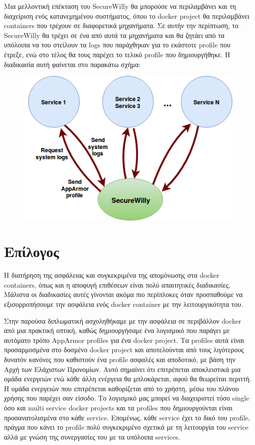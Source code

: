 Μια μελλοντική επέκταση του \en SecureWilly\gr{} θα μπορούσε να περιλαμβάνει και τη διαχείριση ενός κατανεμημένου συστήματος, όπου το \en docker project\gr{} θα περιλαμβάνει \en containers\gr{} που τρέχουν σε διαφορετικά μηχανήματα. Σε αυτήν την περίπτωση, το \en SecureWilly\gr{} θα τρέχει σε ένα από αυτά τα μηχανήματα και θα ζητάει από τα υπόλοιπα να του στείλουν τα \en logs\gr{} που παράχθηκαν για το εκάστοτε \en profile\gr{} που έτρεξε, ενώ στο τέλος θα τους παρέχει το τελικό \en profile\gr{} που δημιουργήθηκε. Η διαδικασία αυτή φαίνεται στο παρακάτω σχήμα:
\begin{figure}[H]
  \centering
   \includegraphics[width=0.6\linewidth]{figures/DistributedSystems.png}
\end{figure}

\section*{Επίλογος}

Η διατήρηση της ασφάλειας και συγκεκριμένα της απομόνωσης στα \en docker containers\gr{}, όπως και η αποφυγή επιθέσεων είναι πολύ απαιτητικές διαδικασίες. Μάλιστα οι διαδικασίες αυτές γίνονται ακόμα πιο περίπλοκες όταν προσπαθούμε να εξισορροπήσουμε την ασφάλεια ενός \en docker container\gr{} με την λειτουργικότητα του.

Στην παρούσα διπλωματική ασχοληθήκαμε με την ασφάλεια σε περιβάλλον \en docker\gr{} από μια πρακτική οπτική, καθώς δημιουργήσαμε ένα λογισμικό που παράγει με αυτόματο τρόπο \en AppArmor profiles\gr{} για ένα \en docker project\gr{}. Τα \en profiles\gr{} αυτά είναι προσαρμοσμένα στο δοσμένο \en docker project\gr{} και αποτελούνται από τους λιγότερους δυνατόν κανόνες που καθιστούν ένα \en profile\gr{} ασφαλές και αποδοτικό, με βάση την Αρχή των Ελάχιστων Προνομίων. Αυτό σημαίνει ότι επιτρέπεται αποκλειστικά μια ομάδα ενεργειών ενώ κάθε άλλη ενέργεια θα μπλοκάρεται, αφού θα θεωρείται περιττή. Η ομάδα ενεργειών που επιτρέπεται καθορίζεται από το χρήστη, μέσω του πλάνου χρήσης που παρέχει σαν είσοδο. Το λογισμικό μας μπορεί να διαχειριστεί τόσο \en single\gr{} όσο και \en multi service docker projects\gr{} και τα \en profiles\gr{} που δημιουργούνται είναι προσανατολισμένα στο κάθε \en service\gr{}. Επομένως, κάθε \en service\gr{} έχει το δικό του \en profile\gr{}, πράγμα που κάνει το \en profile\gr{} πολύ συγκεκριμένο σχετικά με τη λειτουργία του \en service\gr{} αλλά με γνώση της συνεργασίες του με τα υπόλοιπα \en services\gr{}. 

